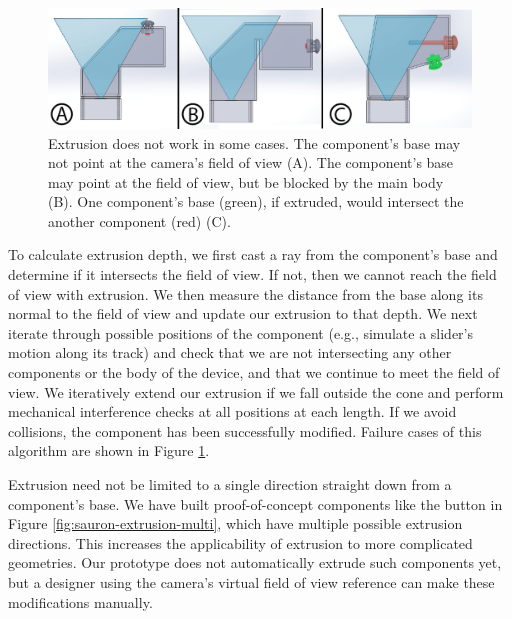\begin{figure}
\centering
\includegraphics[width=\textwidth]{figures/sauron/extrusion-fails.png}
\caption{Extrusion does not work in some cases. The component's base may not point at the camera's field of view (A). The component's base may point at the field of view, but be blocked by the main body (B). One component's base (green), if extruded, would intersect the another component (red) (C).}
\label{fig:sauron-extrusion-fails}
\end{figure}


To calculate extrusion depth, we first cast a ray from the component's base and determine if it intersects the field of view. If not, then we cannot reach the field of view with extrusion. We then measure the distance from the base along its normal to the field of view and update our extrusion to that depth. We next iterate through possible positions of the component (e.g., simulate a slider's motion along its track) and check that we are not intersecting any other components or the body of the device, and that we continue to meet the field of view. We iteratively extend our extrusion if we fall outside the cone and perform mechanical interference checks at all positions at each length. If we avoid collisions, the component has been successfully modified. Failure cases of this algorithm are shown in Figure \ref{fig:sauron-extrusion-fails}.

Extrusion need not be limited to a single direction straight down from a component's base. We have built proof-of-concept components like the button in Figure \ref{fig:sauron-extrusion-multi}, which have multiple possible extrusion directions. This increases the applicability of extrusion to more complicated geometries. Our prototype does not automatically extrude such components yet, but a designer using the camera's virtual field of view reference can make these modifications manually.

